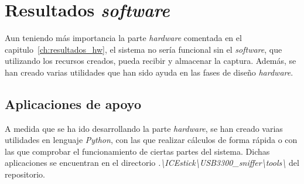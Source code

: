 \chapter{Resultados \emph{software}}
\label{ch:resultados_sw}

Aun teniendo más importancia la parte \emph{hardware} comentada en el capitulo~\ref{ch:resultados_hw}, el sistema no sería funcional sin el \emph{software}, que utilizando los recursos creados, pueda recibir y almacenar la captura. Además, se han creado varias utilidades que han sido ayuda en las fases de diseño \emph{hardware}.

\section{Aplicaciones de apoyo}
A medida que se ha ido desarrollando la parte \emph{hardware}, se han creado varias utilidades en lenguaje \emph{Python}, con las que realizar cálculos de forma rápida o con las que comprobar el funcionamiento de ciertas partes del sistema. Dichas aplicaciones se encuentran en el directorio \emph{.\textbackslash ICEstick\textbackslash USB3300\_sniffer\textbackslash tools\textbackslash} del repositorio.

